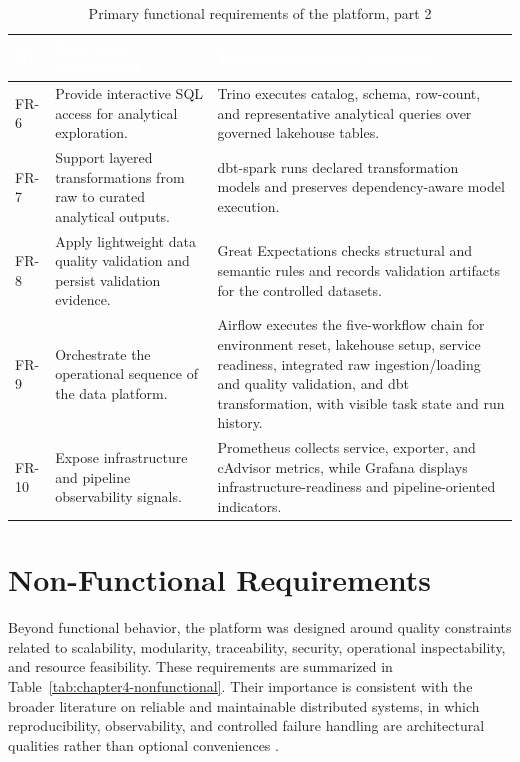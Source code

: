 \begin{table}[!htbp]
    \centering
    \footnotesize
    \renewcommand{\arraystretch}{1.16}
    \begin{tabularx}{\textwidth}{|L{1.3cm}|Y|Y|}
        \hline
        \textcolor{white}{\textbf{ID}} & \textcolor{white}{\textbf{Functional requirement}} & \textcolor{white}{\textbf{Technical acceptance criterion}} \\
        \hline
        FR-6 & Provide interactive SQL access for analytical exploration. & Trino executes catalog, schema, row-count, and representative analytical queries over governed lakehouse tables. \\
        \hline
        FR-7 & Support layered transformations from raw to curated analytical outputs. & dbt-spark runs declared transformation models and preserves dependency-aware model execution. \\
        \hline
        FR-8 & Apply lightweight data quality validation and persist validation evidence. & Great Expectations checks structural and semantic rules and records validation artifacts for the controlled datasets. \\
        \hline
        FR-9 & Orchestrate the operational sequence of the data platform. & Airflow executes the five-workflow chain for environment reset, lakehouse setup, service readiness, integrated raw ingestion/loading and quality validation, and dbt transformation, with visible task state and run history. \\
        \hline
        FR-10 & Expose infrastructure and pipeline observability signals. & Prometheus collects service, exporter, and cAdvisor metrics, while Grafana displays infrastructure-readiness and pipeline-oriented indicators. \\
        \hline
    \end{tabularx}
    \caption{Primary functional requirements of the platform, part 2}
    \label{tab:chapter4-functional-part2}
\end{table}
\FloatBarrier

\section{Non-Functional Requirements}
Beyond functional behavior, the platform was designed around quality constraints related to scalability, modularity, traceability, security, operational inspectability, and resource feasibility. These requirements are summarized in Table~\ref{tab:chapter4-nonfunctional}. Their importance is consistent with the broader literature on reliable and maintainable distributed systems, in which reproducibility, observability, and controlled failure handling are architectural qualities rather than optional conveniences \cite{kleppmann2017ddia}.

